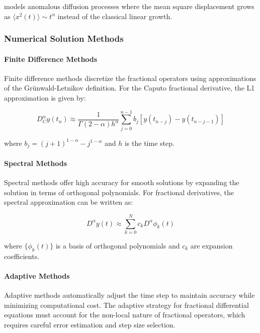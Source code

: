 models anomalous diffusion processes where the mean square displacement grows as $\langle x^2(t) \rangle \sim t^{\alpha}$ instead of the classical linear growth.

\subsubsection{Numerical Solution Methods}

\paragraph{Finite Difference Methods}

Finite difference methods discretize the fractional operators using approximations of the Grünwald-Letnikov definition. For the Caputo fractional derivative, the L1 approximation is given by:

\begin{equation}
D^{\alpha}_C y(t_n) \approx \frac{1}{\Gamma(2-\alpha)h^{\alpha}} \sum_{j=0}^{n-1} b_j [y(t_{n-j}) - y(t_{n-j-1})]
\end{equation}

where $b_j = (j+1)^{1-\alpha} - j^{1-\alpha}$ and $h$ is the time step.

\paragraph{Spectral Methods}

Spectral methods offer high accuracy for smooth solutions by expanding the solution in terms of orthogonal polynomials. For fractional derivatives, the spectral approximation can be written as:

\begin{equation}
D^{\alpha} y(t) \approx \sum_{k=0}^{N} c_k D^{\alpha} \phi_k(t)
\end{equation}

where $\{\phi_k(t)\}$ is a basis of orthogonal polynomials and $c_k$ are expansion coefficients.

\paragraph{Adaptive Methods}

Adaptive methods automatically adjust the time step to maintain accuracy while minimizing computational cost. The adaptive strategy for fractional differential equations must account for the non-local nature of fractional operators, which requires careful error estimation and step size selection.

